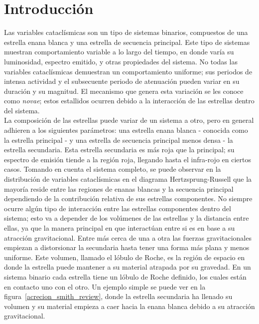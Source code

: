 \chapter{Introducción}

Las variables cataclísmicas son un tipo de sistemas binarios, compuestos de una estrella enana blanca y una estrella de secuencia principal. Este tipo de sistemas muestran comportamiento variable a lo largo del tiempo, en donde varía su luminosidad, espectro emitido, y otras propiedades del sistema. No todas las variables cataclísmicas demuestran un comportamiento uniforme; sus periodos de intensa actividad y el subsecuente periodo de atenuación pueden variar en su duración y su magnitud. El mecanismo que genera esta variación se les conoce como \textit{novae}; estos estallidos ocurren debido a la interacción de las estrellas dentro del sistema.
\\\newline
La composición de las estrellas puede variar de un sistema a otro, pero en general adhieren a los siguientes parámetros: una estrella enana blanca - conocida como la estrella principal - y una estrella de secuencia principal menos densa - la estrella secundaria. Esta estrella secundaria es más roja que la principal; su espectro de emisión tiende a la región roja, llegando hasta el infra-rojo en ciertos casos. Tomando en cuenta el sistema completo, se puede observar en la distribución de variables cataclísmicas en el diagrama Hertzsprung-Russell que la mayoría reside entre las regiones de enanas blancas y la secuencia principal dependiendo de la contribución relativa de sus estrellas componentes. \citet{disentanglingGaiaHR} No siempre ocurre algún tipo de interacción entre las estrellas componentes dentro del sistema; esto va a depender de los volúmenes de las estrellas y la distancia entre ellas, ya que la manera principal en que interactúan entre si es en base a su atracción gravitacional. Entre más cerca de una a otra las fuerzas gravitacionales empiezan a distorsionar la secundaria hasta tener una forma más plana y menos uniforme. Este volumen, llamado el lóbulo de Roche, es la región de espacio en donde la estrella puede mantener a su material atrapada por su gravedad. En un sistema binario cada estrella tiene un lóbulo de Roche definido, los cuales están en contacto uno con el otro. Un ejemplo simple se puede ver en la figura~\ref{acrecion_smith_review}, donde la estrella secundaria ha llenado su volumen y su material empieza a caer hacia la enana blanca debido a su atracción gravitacional.
\\\newline
